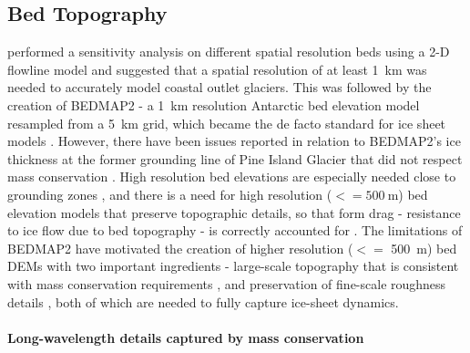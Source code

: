 
\subsection{Bed Topography}

\citet{DurandImpactbedrockdescription2011} performed a sensitivity analysis on different spatial resolution beds using a 2-D flowline model and suggested that a spatial resolution of at least \SI{1}{\kilo\metre} was needed to accurately model coastal outlet glaciers.
This was followed by the creation of BEDMAP2 \citep{FretwellBedmap2improvedice2013} - a \SI{1}{\kilo\metre} resolution Antarctic bed elevation model resampled from a \SI{5}{\kilo\metre} grid, which became the de facto standard for ice sheet models \citep[see e.g.][]{SeroussiinitMIPAntarcticaicesheet2019}.
However, there have been issues reported in relation to BEDMAP2's ice thickness at the former grounding line of Pine Island Glacier that did not respect mass conservation \citep{RignotWidespreadrapidgrounding2014}.
High resolution bed elevations are especially needed close to grounding zones \citep[e.g.][]{SchoofIcesheetgrounding2007,CornfordAdaptivemeshrefinement2016}, and there is a need for high resolution ($<= \SI{500}{\metre}$) bed elevation models that preserve topographic details, so that form drag - resistance to ice flow due to bed topography - is correctly accounted for \citep{BinghamDiverselandscapesPine2017,Kyrke-SmithRelevanceDetailBasal2018}.
The limitations of BEDMAP2 have motivated the creation of higher resolution ($<=$ \SI{500}{\metre}) bed \gls{DEM}s with two important ingredients - large-scale topography that is consistent with mass conservation requirements \citep[e.g.][]{Morlighemmassconservationapproach2011}, and preservation of fine-scale roughness details \citep[e.g.][]{GoffConditionalsimulationThwaites2014,Grahamhighresolutionsyntheticbed2017}, both of which are needed to fully capture ice-sheet dynamics.

\paragraph{Long-wavelength details captured by mass conservation}


